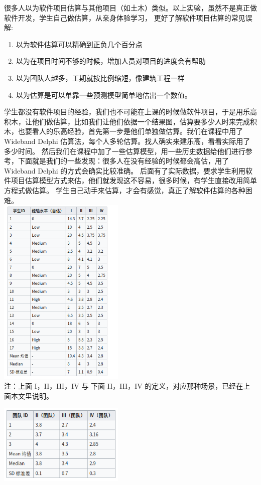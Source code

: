 很多人以为软件项目估算与其他项目（如土木）类似。以上实验，虽然不是真正做软件开发，学生自己做估算，从亲身体验学习，
更好了解软件项目估算的常见误解:

\begin{enumerate}
\tightlist
\item
  以为软件估算可以精确到正负几个百分点
\item
  以为在项目时间不够的时候，增加人员对项目的进度会有帮助
\item
  以为团队人越多，工期就按比例缩短，像建筑工程一样
\item
  以为估算是可以单靠一些预测模型简单地估出一个数值。
\end{enumerate}

学生都没有软件项目的经验，我们也不可能在上课的时候做软件项目，于是用乐高积木，让他们做估算，比如我们让他们依据一个结果图，估算要多少人时来完成积木，也要看人的乐高经验，首先第一步是他们单独做估算。我们在课程中用了Wideband
Delphi 估算法，每个人多轮估算。找人确实来建乐高，看看实际用了多少时间。
然后我们在课程中加了一些估算模型，用一些历史数据给他们进行参考，下面就是我们的一些发现：很多人在没有经验的时候都会高估，用了Wideband
Delphi 的方式会确实比较准确。
后面有了实际数据，要求学生利用软件项目估算模型方式来估，他们就发现这不容易，很多时候，有学生直接改用简单方程式做估算。
学生自己动手来估算，才会有感觉，真正了解软件估算的各种困难。\\
\includegraphics[width=6cm]{Screenshotfrom2023-01-0602-54-00.png}\\

注：上面 I，II，III，IV 与 下面 II，III，IV
的定义，对应那种场景，已经在上面本文里说明。

\includegraphics[width=6cm]{Screenshotfrom2023-01-0602-54-26.png}\\


